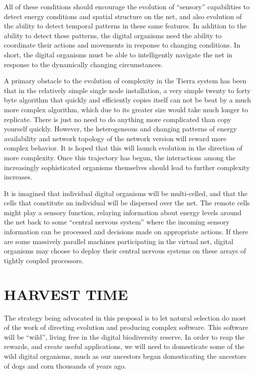 All of these conditions should encourage the evolution of ``sensory''
capabilities to detect energy conditions and spatial structure on the
net, and also evolution of the ability to detect temporal patterns in
these same features.  In addition to the ability to detect these
patterns, the digital organisms need the ability to coordinate
their actions and movements in response to changing conditions.
In short, the digital organisms must be able to intelligently navigate
the net in response to the dynamically changing circumstances.

A primary obstacle to the evolution of complexity in the Tierra system
has been that in the relatively simple single node installation, a very
simple twenty to forty byte algorithm that quickly and efficiently copies
itself can not be beat by a much more complex algorithm, which due to
its greater size would take much longer to replicate.  There is just
no need to do anything more complicated than copy yourself quickly.
However, the heterogeneous and changing patterns of energy availability
and network topology of the network version will reward more complex
behavior.  It is hoped that this will launch evolution in the direction
of more complexity.  Once this trajectory has begun, the interactions
among the increasingly sophisticated organisms themselves should lead
to further complexity increases.

It is imagined that individual digital organisms will be multi-celled,
and that the cells that constitute an individual will be dispersed over
the net.  The remote cells might play a sensory function, relaying
information about energy levels around the net back to some ``central
nervous system'' where the incoming sensory information can be processed
and decisions made on appropriate actions.  If there are some massively
parallel machines participating in the virtual net, digital organisms
may choose to deploy their central nervous systems on these arrays of
tightly coupled processors.

\section{\bf HARVEST TIME}

The strategy being advocated in this proposal is to let natural selection
do most of the work of directing evolution and producing complex
software.  This software will be ``wild'', living free in the digital
biodiversity reserve.  In order to reap the rewards, and create
useful applications, we will need to domesticate some of the wild
digital organisms, much as our ancestors began domesticating the
ancestors of dogs and corn thousands of years ago.

